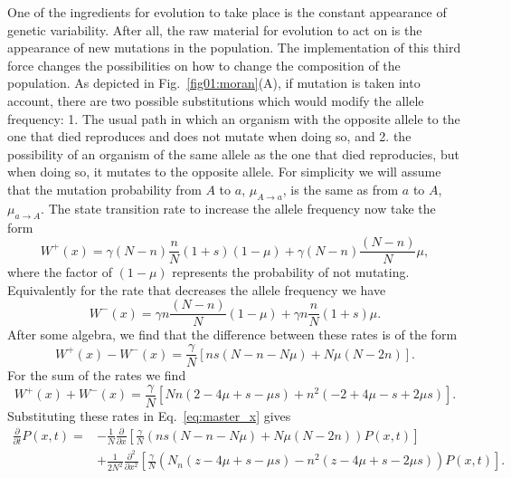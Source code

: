 One of the ingredients for evolution to take place is the constant appearance of
genetic variability. After all, the raw material for evolution to act on is the
appearance of new mutations in the population. The implementation of this third
force changes the possibilities on how to change the composition of the
population. As depicted in Fig.~\ref{fig01:moran}(A), if mutation is taken into
account, there are two possible substitutions which would modify the allele
frequency: 1. The usual path in which an organism with the opposite allele to
the one that died reproduces and does not mutate when doing so, and 2. the
possibility of an organism of the same allele as the one that died reproducies,
but when doing so, it mutates to the opposite allele. For simplicity we will
assume that the mutation probability from $A$ to $a$, $\mu_{A\rightarrow a}$, is
the same as from $a$ to $A$, $\mu_{a\rightarrow A}$. The state transition rate
to increase the allele frequency now take the form
\begin{equation}
    W^{+}(x) = \gamma(N-n) \frac{n}{N}(1+s)(1-\mu)+\gamma(N-n) \frac{(N-n)}{N} \mu,
\end{equation}
where the factor of $(1 - \mu)$ represents the probability of not mutating.
Equivalently for the rate that decreases the allele frequency we have
\begin{equation}
    W^{-}(x)=\gamma n \frac{(N-n)}{N}(1-\mu)+\gamma n \frac{n}{N}(1+s) \mu.
\end{equation}
After some algebra, we find that the difference between these rates is of the
form
\begin{equation}
    W^+(x) - W^-(x) = 
    \frac{\gamma}{N}\left[n s\left(N-n-N\mu\right)+N{\mu}(N-2 n)\right].
\end{equation}
For the sum of the rates we find
\begin{equation}
    W^+(x) + W^-(x) =
    \frac{\gamma}{N}\left[N n(2-4 \mu+s-\mu s) + 
    n^{2}(-2+4 \mu-s+2 \mu s)\right].
\end{equation}
Substituting these rates in Eq.~\ref{eq:master_x} gives
\begin{equation}
\begin{split}
    \frac{\partial}{\partial t} P(x, t)=
    &-\frac{1}{N} \frac{\partial}{\partial x}
    \left[\frac{\gamma}{N}\left(n s\left(N-n-N\mu\right)+
    N\mu(N-2 n)\right) P(x, t)\right] \\
    &+\frac{1}{2 N^{2}} \frac{\partial^2}{\partial x^{2}}
    \left[\frac{\gamma}{N}\left(N_{n}(z-4 \mu+s-\mu s)
    -n^{2}\left(z-4 \mu+s-2\mu s\right)\right) P(x, t)\right].
\end{split}
\end{equation}
